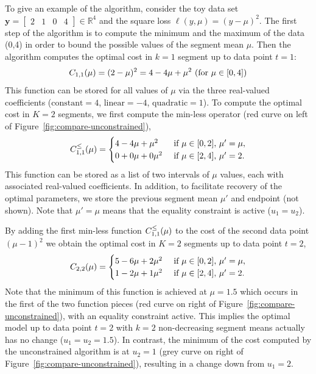 \documentclass[aoas]{imsart}
\newcommand{\RR}{\mathbb R}
\begin{document}
To give an example of the algorithm, consider the 
toy data set $\mathbf y= \left[
\begin{array}{cccccc}
  2 & 1 & 0 & 4
\end{array}
\right] \in\RR^4$ and the square loss $\ell(y,\mu)=(y-\mu)^2$. The first
step of the algorithm is to compute the minimum and the maximum of the
data (0,4) in order to bound the possible values of the segment
mean $\mu$. Then the algorithm computes the optimal cost in $k=1$ segment up
to data point $t=1$:
\begin{equation}
  \FCC_{1,1}(\mu) = (2-\mu)^2=4 - 4\mu + \mu^2\text{ (for $\mu\in[0,4]$)}
\end{equation}
This function can be stored for all values of $\mu$ via the three
real-valued coefficients ($\text{constant}=4$, $\text{linear}=-4$,
$\text{quadratic}=1$). To compute the optimal cost in $K=2$ segments,
we first compute the min-less operator (red curve on left of
Figure~\ref{fig:compare-unconstrained}),
\begin{equation}
  \FCC_{1,1}^\leq(\mu) =
  \begin{cases}
    4 - 4\mu + \mu^2 &\text{ if }\mu\in[0,2],\, \mu'=\mu,\\
    0 + 0\mu + 0\mu^2 & \text{ if }\mu\in[2,4],\,  \mu'=2.
  \end{cases}
\end{equation}
This function can be stored as a list of two
intervals of $\mu$ values, each with associated real-valued
coefficients. In addition, to facilitate recovery of the optimal
parameters, we store the previous segment mean $\mu'$ and endpoint
(not shown). Note that $\mu'=\mu$ means that the equality constraint
is active ($u_1=u_2$).


By adding the first min-less function $C_{1,1}^\leq(\mu)$ to the
cost of the second data point $(\mu-1)^2$ we obtain the optimal cost in $K=2$
segments up to data point $t=2$,
\begin{equation}
  \FCC_{2,2}(\mu) = 
  \begin{cases}
    5 - 6\mu + 2\mu^2 &\text{ if }\mu\in[0,2],\,  \mu'=\mu,\\
    1 - 2\mu + 1\mu^2 &\text{ if }\mu\in[2,4],\,  \mu'=2.
  \end{cases}
\end{equation}
Note that the minimum of this function is achieved at $\mu=1.5$ which
occurs in the first of the two function pieces (red curve on right of
Figure~\ref{fig:compare-unconstrained}), with an equality constraint
active. This implies the optimal model up to data point $t=2$ with
$k=2$ non-decreasing segment means actually has no change
($u_1=u_2=1.5$). In contrast, the minimum of the cost computed by the
unconstrained algorithm is at $u_2=1$ (grey curve on right of
Figure~\ref{fig:compare-unconstrained}), resulting in a change down
from $u_1=2$.
\end{document}
